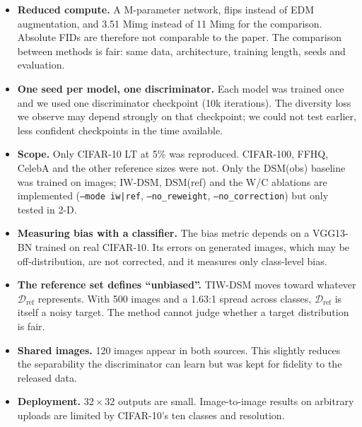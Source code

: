 \documentclass[10pt,a4paper]{article}
\makeatletter
\renewcommand\section{\@startsection{section}{1}{\z@}{1.2ex \@plus .2ex \@minus .1ex}{0.5ex \@plus .1ex}{\normalfont\Large\bfseries\color{Navy}}}
\newcommand{\Dref}{\mathcal{D}_{\mathrm{ref}}}
\makeatother
\begin{document}
\section{Limitations}\label{sec:limits}
\begin{itemize}[leftmargin=5mm,itemsep=2pt,topsep=1pt]
\item \textbf{Reduced compute.} A \resParams M-parameter network, flips instead of EDM augmentation, and 3.51 Mimg instead of 11 Mimg for the comparison. Absolute FIDs are therefore not comparable to the paper. The comparison between methods is fair: same data, architecture, training length, seeds and evaluation.
\item \textbf{One seed per model, one discriminator.} Each model was trained once and we used one discriminator checkpoint (10k iterations). The diversity loss we observe may depend strongly on that checkpoint; we could not test earlier, less confident checkpoints in the time available.
\item \textbf{Scope.} Only CIFAR-10 LT at 5\% was reproduced. CIFAR-100, FFHQ, CelebA and the other reference sizes were not. Only the DSM(obs) baseline was trained on images; IW-DSM, DSM(ref) and the W/C ablations are implemented (\texttt{--mode iw|ref}, \texttt{--no\_reweight}, \texttt{--no\_correction}) but only tested in 2-D.
\item \textbf{Measuring bias with a classifier.} The bias metric depends on a VGG13-BN trained on real CIFAR-10. Its errors on generated images, which may be off-distribution, are not corrected, and it measures only class-level bias.
\item \textbf{The reference set defines ``unbiased''.} TIW-DSM moves toward whatever $\Dref$ represents. With 500 images and a 1.63:1 spread across classes, $\Dref$ is itself a noisy target. The method cannot judge whether a target distribution is fair.
\item \textbf{Shared images.} 120 images appear in both sources. This slightly reduces the separability the discriminator can learn but was kept for fidelity to the released data.
\item \textbf{Deployment.} $32\times32$ outputs are small. Image-to-image results on arbitrary uploads are limited by CIFAR-10's ten classes and resolution.
\end{itemize}

\end{document}
